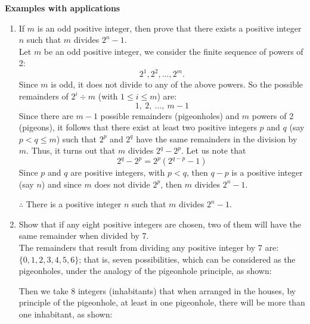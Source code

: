 \documentclass[letterpaper, 11pt]{article}	%
\begin{document}
\noindent \textcolor{neonBlue}{\textbf{\large Examples with applications}}

\begin{enumerate}
	\item If $m$ is an odd positive integer, then prove that there exists a positive integer $n$ such that $m$ divides $2^n-1$.\\[5mm]
		Let $m$ be an odd positive integer, we consider the finite sequence of powers of 2:
		\begin{equation*}
			2^1,2^2,...,2^m.  
		\end{equation*}
		Since $m$ is odd, it does not divide to any of the above powers. So the possible remainders of $2^i\div m$ (with $1\leq i \leq m$) are:
		\begin{equation*}
			1,\ 2,\ ...,\ m-1 
		\end{equation*}
		Since there are $m-1$ possible remainders (pigeonholes) and $m$ powers of 2 (pigeons), it follows that there exist at least two positive integers $p$ and $q$ (say $p < q \leq m$) such that $2^p$ and $2^q$ have the same remainders in the division by $m$. Thus, it turns out that $m$ divides $2^q-2^p$. Let us note that
		\begin{equation*}
			2^q-2^p=2^p(2^{q-p}-1) 
		\end{equation*}
		Since $p$ and $q$ are positive integers, with $p < q$, then $q-p$ is a positive integer (say $n$) and since $m$ does not divide $2^p$, then $m$ divides $2^{n}-1$.
		
		$\therefore$ There is a positive integer $n$ such that $m$ divides $2^n-1$.\\[3cm]
	\item Show that if any eight positive integers are chosen, two of them will have the same remainder when divided by 7.\\[5mm]	
	The remainders that result from dividing any positive integer by $7$ are: $\{0, 1, 2, 3, 4, 5, 6\}$; that is, seven possibilities, which can be considered as the pigeonholes, under the analogy of the pigeonhole principle, as shown:
		\begin{center}
			\fbox{\textcolor{gray}{$0$}} \fbox{\textcolor{gray}{$1$}} \fbox{\textcolor{gray}{$2$}} \fbox{\textcolor{gray}{$3$}} \fbox{\textcolor{gray}{$4$}} \fbox{\textcolor{gray}{$5$}} \fbox{\textcolor{gray}{$6$}}
		\end{center}
		
		Then we take 8 integers (inhabitants) that when arranged in the houses, by principle of the pigeonhole, at least in one pigeonhole, there will be more than one inhabitant, as shown:
		\begin{center}
\end{center}
\end{enumerate}
\end{document}
